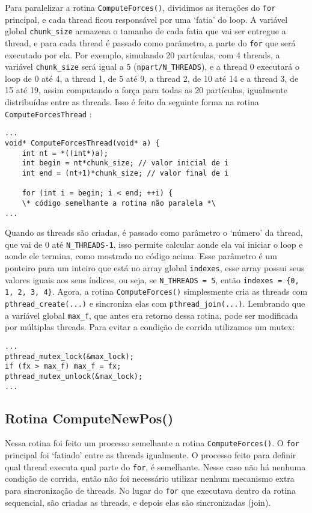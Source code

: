 \documentclass[a4paper, 12pt]{article}
\begin{document}
Para paralelizar a rotina \verb|ComputeForces()|, dividimos as iterações do
\verb|for| principal, e cada thread ficou responsável por uma `fatia' do loop.
A variável global \verb|chunk_size| armazena o tamanho de cada fatia que vai ser
entregue a thread, e para cada thread é passado como parâmetro, a parte do
\verb|for| que será executado por ela. Por exemplo, simulando 20 partículas, com
4 threads, a variável \verb|chunk_size| será igual a 5 (\verb|npart/N_THREADS|),
e a thread 0 executará o loop de 0 até 4, a thread 1, de 5 até 9, a thread 2, de
10 até 14 e a thread 3, de 15 até 19, assim computando a força para todas as 20
partículas, igualmente distribuídas entre as threads. Isso é feito da seguinte
forma na rotina \verb|ComputeForcesThread| :
\begin{verbatim}
...
void* ComputeForcesThread(void* a) {
    int nt = *((int*)a);
    int begin = nt*chunk_size; // valor inicial de i
    int end = (nt+1)*chunk_size; // valor final de i

    for (int i = begin; i < end; ++i) {
    \* código semelhante a rotina não paralela *\
...
\end{verbatim}
Quando as threads são criadas, é passado como parâmetro o `número' da thread,
que vai de 0 até \verb|N_THREADS-1|, isso permite calcular aonde ela vai iniciar
o loop e aonde ele termina, como mostrado no código acima. Esse parâmetro é um
ponteiro para um inteiro que está no array global \verb|indexes|, esse array
possui seus valores iguais aos seus índices, ou seja, se \verb|N_THREADS = 5|,
então \verb|indexes = {0, 1, 2, 3, 4}|.
Agora, a rotina \verb|ComputeForces()| simplesmente cria as threads com
\verb|pthread_create(...)| e sincroniza elas com \verb|pthread_join(...)|.
Lembrando que a variável global \verb|max_f|, que antes era retorno dessa
rotina, pode ser modificada por múltiplas threads. Para evitar a condição de
corrida utilizamos um mutex:
\begin{verbatim}
...
pthread_mutex_lock(&max_lock);
if (fx > max_f) max_f = fx;
pthread_mutex_unlock(&max_lock);
...
\end{verbatim}


\subsection{Rotina ComputeNewPos()}

Nessa rotina foi feito um processo semelhante a rotina \verb|ComputeForces()|. O
\verb|for| principal foi `fatiado' entre as threads igualmente. O processo feito
para definir qual thread executa qual parte do \verb|for|, é semelhante. Nesse
caso não há nenhuma condição de corrida, então não foi necessário utilizar
nenhum mecanismo extra para sincronização de threads. No lugar do \verb|for| que
executava dentro da rotina sequencial, são criadas as threads, e depois elas são
sincronizadas (join).
\end{document}
